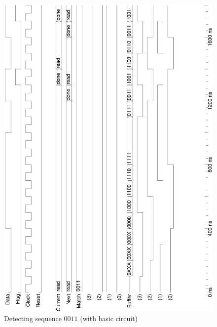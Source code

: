 \documentclass[10pt,a4paper]{report}
\begin{document}
\begin{figure}
\includegraphics[scale=0.49,angle=-90]{graphs/seq_test1.BASIC.ps}
\caption{\small{Detecting sequence $0011$ (with basic circuit)}} \label{wave:usd:t1w2}
\end{figure}
\end{document}
